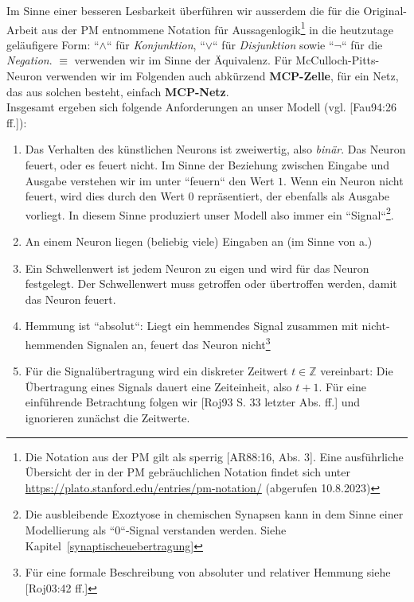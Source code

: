 Im Sinne einer besseren Lesbarkeit überführen wir ausserdem die für die Original-Arbeit aus der PM entnommene Notation für Aussagenlogik\footnote{
    Die Notation aus der PM gilt als sperrig [AR88:16, Abs. 3]. Eine ausführliche Übersicht der in der PM gebräuchlichen Notation findet sich unter \url{https://plato.stanford.edu/entries/pm-notation/} (abgerufen 10.8.2023)
} in die heutzutage geläufigere Form: ``$\land$`` für \textit{Konjunktion}, ``$\lor$`` für \textit{Disjunktion} sowie ``$\neg$`` für die \textit{Negation}. $\equiv$ verwenden wir im Sinne der Äquivalenz.
Für McCulloch-Pitts-Neuron verwenden wir im Folgenden auch abkürzend \textbf{MCP-Zelle}, für ein Netz, das aus solchen besteht, einfach \textbf{MCP-Netz}.\\



Insgesamt ergeben sich folgende Anforderungen an unser Modell (vgl. [Fau94:26 ff.]):

\begin{enumerate}
    \item Das Verhalten des künstlichen Neurons ist zweiwertig, also \textit{binär}. Das Neuron feuert, oder es feuert nicht. Im Sinne der Beziehung zwischen Eingabe und Ausgabe verstehen wir im unter ``feuern`` den Wert $1$. Wenn ein Neuron nicht feuert, wird dies durch den Wert $0$ repräsentiert, der ebenfalls als Ausgabe vorliegt. In diesem Sinne produziert unser Modell also immer ein ``Signal``\footnote{
        Die ausbleibende Exoztyose in chemischen Synapsen kann in dem Sinne einer Modellierung als ``0``-Signal verstanden werden. Siehe Kapitel~\ref{synaptischeuebertragung}
    }.
    \item An einem Neuron liegen (beliebig viele) Eingaben an (im Sinne von a.)
    \item Ein Schwellenwert ist jedem Neuron zu eigen und wird für das Neuron festgelegt. Der Schwellenwert muss getroffen oder übertroffen werden, damit das Neuron feuert.
    \item Hemmung ist ``absolut``: Liegt ein hemmendes Signal zusammen mit nicht-hemmenden Signalen an, feuert das Neuron nicht\footnote{
        Für eine formale Beschreibung von absoluter und relativer Hemmung siehe [Roj03:42 ff.]
    }
    \item Für die Signalübertragung wird ein diskreter Zeitwert $t \in \mathbb{Z}$ vereinbart: Die Übertragung eines Signals dauert eine Zeiteinheit, also $t + 1$. Für eine einführende Betrachtung folgen wir [Roj93 S. 33 letzter Abs. ff.] und ignorieren zunächst die Zeitwerte.
\end{enumerate}


